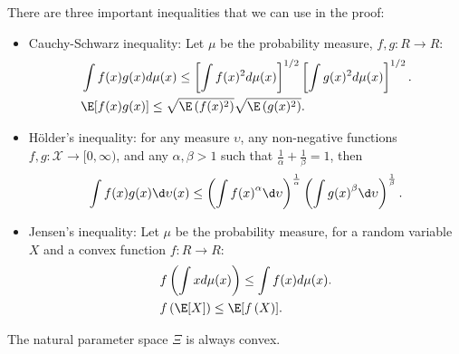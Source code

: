 \documentclass[a4paper]{article}
\begin{document}
\begin{note*} There are three important inequalities that we can use in the proof:
\begin{itemize}
	\item Cauchy-Schwarz inequality: Let $\mu$ be the probability measure, $f,g: R \rightarrow R$:
	\begin{equation*}
	\begin{aligned}
		& \int f(x) g(x) d \mu(x) \leq\left[\int f(x)^{2} d \mu(x)\right]^{1 / 2}\left[\int g(x)^{2} d \mu(x)\right]^{1 / 2}. \\
        & \E[f(x) g(x)] \leq \sqrt{\E\left(f(x)^{2}\right)} \sqrt{\E\left(g(x)^{2}\right)}.	
	\end{aligned}
	\end{equation*}	
	\item Hölder's inequality: for any measure $\upsilon$, any non-negative functions $f,g: \mathcal{X} \to [0,\infty)$, and any $\alpha,\beta > 1$ such that $\frac{1}{\alpha}+\frac{1}{\beta} = 1$, then
	\begin{equation*}
		\int f(x)g(x) \d \upsilon (x) \leq \left(\int {f(x)}^{\alpha} \d \upsilon\right)^{\frac{1}{\alpha}}\left(\int {g(x)}^{\beta} \d \upsilon\right)^{\frac{1}{\beta}}.
	\end{equation*}	
	\item Jensen’s inequality: Let $\mu$ be the probability measure, for a random variable $X$ and a convex function $f: R \rightarrow R$: 
	\begin{equation*}
	\begin{aligned}
		& f \left(\int x d \mu(x) \right) \leq \int f(x) d \mu(x). \\
		& f \left(\E [X] \right) \leq \E[ f \left( X \right)].
	\end{aligned}
	\end{equation*}	
\end{itemize}
\end{note*}

\begin{prop}
	The natural parameter space $\Xi$ is always convex.
\end{prop}
\end{document}
